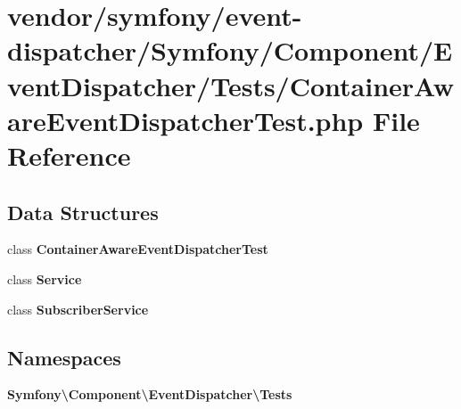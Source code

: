 \section{vendor/symfony/event-\/dispatcher/\+Symfony/\+Component/\+Event\+Dispatcher/\+Tests/\+Container\+Aware\+Event\+Dispatcher\+Test.php File Reference}
\label{_container_aware_event_dispatcher_test_8php}
\subsection*{Data Structures}
\begin{DoxyCompactItemize}
\item 
class {\bf Container\+Aware\+Event\+Dispatcher\+Test}
\item 
class {\bf Service}
\item 
class {\bf Subscriber\+Service}
\end{DoxyCompactItemize}
\subsection*{Namespaces}
\begin{DoxyCompactItemize}
\item 
 {\bf Symfony\textbackslash{}\+Component\textbackslash{}\+Event\+Dispatcher\textbackslash{}\+Tests}
\end{DoxyCompactItemize}
